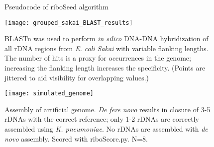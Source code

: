 \begin{figure}[h]
  \centering
  \begin{minipage}{.6\linewidth}
    \begin{algorithm}[H]
    \end{algorithm}
  \end{minipage}
  \caption{Pseudocode of riboSeed algorithm}
  \label{fig:algo}
\end{figure}


\begin{figure}[H]
    \centering
    \hspace*{0cm}\texttt{[image: grouped\_sakai\_BLAST\_results]}
    \caption{BLASTn was used to perform \textit{in silico} DNA-DNA hybridization of all rDNA regions from \textit{E. coli Sakai} with variable flanking lengths. The number of hits is a proxy for occurrences in the genome; increasing the flanking length increases the specificity. (Points are jittered to aid visibility for overlapping values.)}
    \label{fig:blast}
  \end{figure}

\begin{figure}[H]
    \centering
    \hspace*{0cm}\texttt{[image: simulated\_genome]}
    \caption{Assembly of artificial genome. \textit{De fere novo} results in closure of 3-5 rDNAs with the correct reference; only 1-2 rDNAs are correctly assembled using \textit{K. pneumoniae}.  No rDNAs are assembled with \textit{de novo} assembly. Scored with riboScore.py. N=8.}
    \label{fig:simgenome}
\end{figure}


